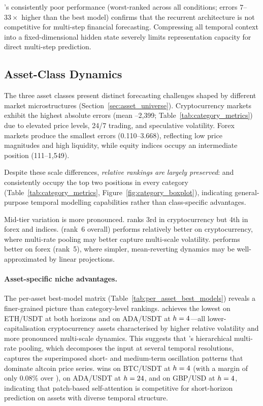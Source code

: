 \lstm's consistently poor performance (worst-ranked across all conditions; errors $7$--$33\times$ higher than the best model) confirms that the recurrent architecture is not competitive for multi-step financial forecasting.  Compressing all temporal context into a fixed-dimensional hidden state severely limits representation capacity for direct multi-step prediction.

\subsection{Asset-Class Dynamics}
\label{sec:asset_dynamics}

The three asset classes present distinct forecasting challenges shaped by different market microstructures (Section~\ref{sec:asset_universe}).  Cryptocurrency markets exhibit the highest absolute errors (mean --2{,}399; Table~\ref{tab:category_metrics}) due to elevated price levels, 24/7 trading, and speculative volatility.  Forex markets produce the smallest errors (0.110--3.668), reflecting low price magnitudes and high liquidity, while equity indices occupy an intermediate position (111--1{,}549).

Despite these scale differences, \emph{relative rankings are largely preserved}: \moderntcn and \patchtst consistently occupy the top two positions in every category (Table~\ref{tab:category_metrics}, Figure~\ref{fig:category_boxplot}), indicating general-purpose temporal modelling capabilities rather than class-specific advantages.

Mid-tier variation is more pronounced.  \timexer ranks 3rd in cryptocurrency but 4th in forex and indices.  \nhits (rank~6 overall) performs relatively better on cryptocurrency, where multi-rate pooling may better capture multi-scale volatility.  \dlinear performs better on forex (rank~5), where simpler, mean-reverting dynamics may be well-approximated by linear projections.

\paragraph{Asset-specific niche advantages.}
The per-asset best-model matrix (Table~\ref{tab:per_asset_best_models}) reveals a finer-grained picture than category-level rankings.  \nhits achieves the lowest \rmse on ETH/USDT at both horizons and on ADA/USDT at $h=4$---all lower-capitalisation cryptocurrency assets characterised by higher relative volatility and more pronounced multi-scale dynamics.  This suggests that \nhits's hierarchical multi-rate pooling, which decomposes the input at several temporal resolutions, captures the superimposed short- and medium-term oscillation patterns that dominate altcoin price series.  \patchtst wins on BTC/USDT at $h=4$ (with a margin of only 0.08\% over \moderntcn), on ADA/USDT at $h=24$, and on GBP/USD at $h=4$, indicating that patch-based self-attention is competitive for short-horizon prediction on assets with diverse temporal structure.

